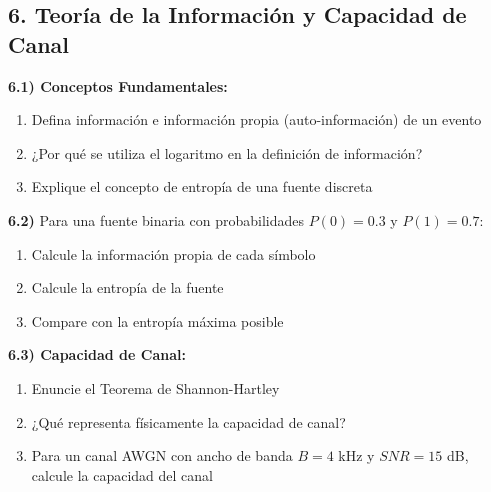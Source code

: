 \subsection*{6. Teoría de la Información y Capacidad de Canal}

\textbf{6.1) Conceptos Fundamentales:}
\begin{enumerate}[label=\alph*)]
    \item Defina información e información propia (auto-información) de un evento
    \item ¿Por qué se utiliza el logaritmo en la definición de información?
    \item Explique el concepto de entropía de una fuente discreta
\end{enumerate}

\textbf{6.2)} Para una fuente binaria con probabilidades \(P(0) = 0.3\) y \(P(1) = 0.7\):
\begin{enumerate}[label=\alph*)]
    \item Calcule la información propia de cada símbolo
    \item Calcule la entropía de la fuente
    \item Compare con la entropía máxima posible
\end{enumerate}

\textbf{6.3) Capacidad de Canal:}
\begin{enumerate}[label=\alph*)]
    \item Enuncie el Teorema de Shannon-Hartley
    \item ¿Qué representa físicamente la capacidad de canal?
    \item Para un canal AWGN con ancho de banda \(B = 4\) kHz y \(SNR = 15\) dB, calcule la capacidad del canal
\end{enumerate}